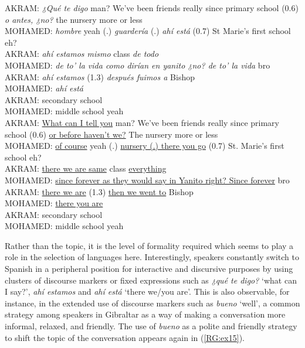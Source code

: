 \documentclass[output=paper]{langscibook}
\begin{document}
\begin{exe}\ex\label{RG:ex14}
AKRAM: \textit{¿Qué te digo} man? We’ve been friends really since primary school (0.6) \textit{o antes, ¿no?} the nursery more or less\\
MOHAMED: \textit{hombre} yeah (.) \textit{guardería} (.) \textit{ahí está }(0.7) St Marie’s first school eh?\\
AKRAM: \textit{ahí estamos mismo} class \textit{de todo}\\
MOHAMED: \textit{de to’ la vida como dirían en yanito ¿no? de to’ la vida} bro\\
AKRAM: \textit{ahí estamos} (1.3) \textit{después fuimos a} Bishop\\
MOHAMED: \textit{ahí está}\\
AKRAM: secondary school\\
MOHAMED: middle school yeah\\

AKRAM: \ul{What can I tell you} man? We’ve been friends really since primary school (0.6) \ul{or before haven’t we?} The nursery more or less\\
MOHAMED: \ul{of course} yeah (.) \ul{nursery (.) there you go} (0.7) St. Marie’s first school eh?\\
AKRAM: \ul{there we are same} class \ul{everything}\\
MOHAMED: \ul{ since forever as they would say in Yanito right? Since forever} bro\\
AKRAM: \ul{there we are} (1.3) \ul{then we went to} Bishop\\
MOHAMED: \ul{there you are}\\
AKRAM: secondary school\\
MOHAMED: middle school yeah
\end{exe}

Rather than the topic, it is the level of formality required which seems to play a role in the selection of languages here. Interestingly, speakers constantly switch to Spanish in a peripheral position for interactive and discursive purposes by using clusters of discourse markers or fixed expressions such as \textit{¿qué te digo?} ‘what can I say?’, \textit{ahí estamos} and \textit{ahí está} ‘there we/you are’. This is also observable, for instance, in the extended use of discourse markers such as \textit{bueno} ‘well’, a common strategy among speakers in Gibraltar as a way of making a conversation more informal, relaxed, and friendly. The use of \textit{bueno} as a polite and friendly strategy to shift the topic of the conversation appears again in (\ref{RG:ex15}).
\end{document}
